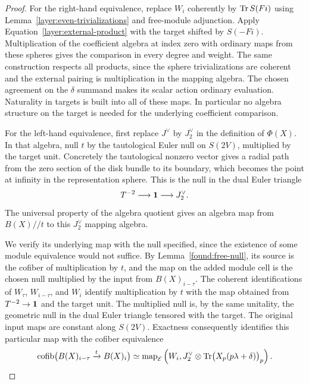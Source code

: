 \begin{proof}
For the right-hand equivalence, replace $W_i$ coherently by
$\operatorname{Tr} S(Fi)$ using Lemma~\ref{layer:even-trivializations} and
free-module adjunction. Apply
Equation~\eqref{layer:external-product} with the target shifted by
$S(-Fi)$. Multiplication of the coefficient algebra at index zero
with ordinary maps from these spheres gives the comparison in
every degree and weight. The same construction respects all
products, since the sphere trivializations are coherent and the
external pairing is multiplication in the mapping algebra. The
chosen agreement on the $\delta$ summand makes its scalar action
ordinary evaluation. Naturality in targets is built into all of
these maps. In particular no algebra structure on the target is
needed for the underlying coefficient comparison.

For the left-hand equivalence, first replace $J^\vee$ by
$J_2^\vee$ in the definition of $\Phi(X)$. In that algebra, null
$t$ by the tautological Euler null on $S(2V)$, multiplied by the
target unit. Concretely the tautological nonzero vector gives a
radial path from the zero section of the disk bundle to its
boundary, which becomes the point at infinity in the representation
sphere. This is the null in the dual Euler triangle
\[
 T^{-2}\longrightarrow\mathbf 1\longrightarrow J_2^\vee.
\]
The universal property of the algebra quotient gives an algebra
map from $B(X)//t$ to this $J_2^\vee$ mapping algebra.

We verify its underlying map with the null specified, since the
existence of some module equivalence would not suffice. By
Lemma~\ref{found:free-null}, its source is the cofiber of
multiplication by $t$, and the map on the added module cell is the
chosen null multiplied by the input from $B(X)_{i-\tau}$. The
coherent identifications of $W_\tau$, $W_{i-\tau}$, and $W_i$
identify multiplication by $t$ with the map obtained from
$T^{-2}\to\mathbf 1$ and the target unit. The multiplied null is,
by the same unitality, the geometric null in the dual Euler
triangle tensored with the target. The original input maps are
constant along $S(2V)$. Exactness consequently identifies this
particular map with the cofiber equivalence
\begin{equation}
 \label{layer:chosen-null-cofiber}
 \operatorname{cofib}\bigl(B(X)_{i-\tau}\xrightarrow{t}B(X)_i\bigr)
 \simeq\operatorname{map}_{\mathcal E}
 \left(W_i,J_2^\vee\otimes
 \operatorname{Tr}\bigl(X_p(p\lambda+\delta)\bigr)_p\right).
\end{equation}


\end{proof}
